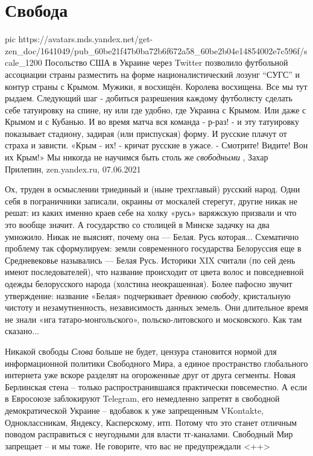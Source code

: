  
 
 
 
 
\chapter{Свобода}

\ifcmt
  pic https://avatars.mds.yandex.net/get-zen_doc/1641049/pub_60be21f47b0ba72b6f672a58_60be2b04e14854002e7c596f/scale_1200
\fi
Посольство США в Украине через Twitter позволило футбольной ассоциации страны
разместить на форме националистический лозунг \enquote{СУГС} и контур страны с Крымом.
Мужики, я восхищён. Королева восхищена. Все мы тут рыдаем. Следующий шаг -
добиться разрешения каждому футболисту сделать себе татуировку на спине, ну или
где удобно, где Украина с Крымом.  Или даже с Крымом и с Кубанью.  И во время
матча вся команда - р-раз! - и эту татуировку показывает стадиону, задирая (или
приспуская) форму. И русские плачут от страха и зависти.  «Крым - их! - кричат
русские в ужасе. - Смотрите! Видите! Вон их Крым!» Мы никогда не научимся быть
столь же \emph{свободными}
, 
Захар Прилепин, zen.yandex.ru, 07.06.2021

Ох, труден в осмыслении триединый и (ныне трехглавый) русский народ. Одни себя
в пограничники записали, окраины от москалей стерегут, другие никак не решат:
из каких именно краев себе на холку «русь» варяжскую призвали и что это вообще
значит. А государство со столицей в Минске задачку на два умножило. Никак не
выяснят, почему она — Белая. Русь которая... Схематично проблему так
сформулируем: земли современного государства Белоруссия еще в Средневековье
назывались — Белая Русь. Историки XIX считали (по сей день имеют
последователей), что название происходит от цвета волос и повседневной одежды
белорусского народа (холстина неокрашенная). Более пафосно звучит утверждение:
название «Белая» подчеркивает \emph{древнюю свободу}, кристальную чистоту и
незамутненность, независимость данных земель. Они длительное время не знали
«ига татаро-монгольского», польско-литовского и московского. Как там сказано...

Никакой свободы \emph{Слова} больше не будет, цензура становится нормой для
информационной политики Свободного Мира, а единое пространство глобального
интернета уже вскоре разделят на огороженные друг от друга сегменты. Новая
Берлинская стена – только распространившаяся практически повсеместно. А если в
Евросоюзе заблокируют Telegram, его немедленно запретят в свободной
демократической Украине – вдобавок к уже запрещенным VKontakte, Одноклассникам,
Яндексу, Касперскому, итп. Потому что это станет отличным поводом расправиться
с неугодными для власти тг-каналами. Свободный Мир запрещает – и мы тоже.  Не
говорите, что вас не предупреждали
  <++>
